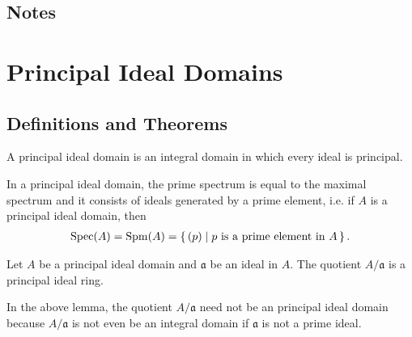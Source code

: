 \subsection*{Notes}

\newpage
\section{Principal Ideal Domains}
\subsection*{Definitions and Theorems}

\begin{defbox}
    \begin{definition}
        A principal ideal domain is an integral domain in which every ideal is principal.
    \end{definition}
\end{defbox}

\begin{thmbox}
    \begin{lemma}
        In a principal ideal domain, the prime spectrum is equal to the maximal spectrum and it consists of ideals generated by a prime element, i.e. if \(A\) is a principal ideal domain, then
        \begin{align*}
            \mathrm{Spec}(A) = \mathrm{Spm}(A) = \left\{\, (p) \mid p \text{ is a prime element in } A \,\right\} \text{.}
        \end{align*}
    \end{lemma}
\end{thmbox}

\begin{thmbox}
    \begin{lemma}
        Let \(A\) be a principal ideal domain and \(\mathfrak{a}\) be an ideal in \(A\). The quotient \(A/\mathfrak{a}\) is a principal ideal ring.
    \end{lemma}
\end{thmbox}

\begin{rembox}
    \begin{remark}
        In the above lemma, the quotient \(A / \mathfrak{a}\) need not be an principal ideal domain because \(A / \mathfrak{a}\) is not even be an integral domain if \(\mathfrak{a}\) is not a prime ideal.
    \end{remark}
\end{rembox}

